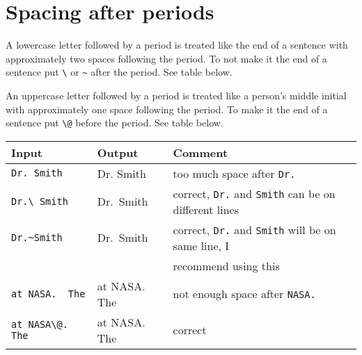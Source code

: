 \UndefineShortVerb{\|}
\DefineShortVerb{\;}  %
\noindent
{
  \setlength{\tabcolsep}{8.5pt}
}
\UndefineShortVerb{\;}
\DefineShortVerb{\|}  %


\section{Spacing after periods}

A lowercase letter followed by a period
is treated like the end of a sentence
with approximately two spaces following the period.
To not make it the end of a sentence put \verb+\+
or \verb+~+ after the period.
See table below.

An uppercase letter followed by a period
is treated like a person's middle initial
with approximately one space following the period.
To make it the end of a sentence put \verb+\@+
before the period.
See table below.

\begin{singlespace}
  \begin{tabular}{@{}lll@{}}
    \toprule
    \bfseries Input& \bfseries Output& \bfseries Comment\\
    \midrule
    \noalign{\vspace{2pt}}
    \verb+Dr. Smith+& Dr. Smith& too much space after \verb+Dr.+\\
    \verb+Dr.\ Smith+& Dr.\ Smith& correct, \verb+Dr.+ and \verb+Smith+ can be on different lines\\
    \verb+Dr.~Smith+& Dr.~Smith& correct, \verb+Dr.+ and \verb+Smith+ will be on same line, I\\
    & & recommend using this\\
    \noalign{\vspace{6pt}}
    \verb+at NASA.  The+& at NASA.  The& not enough space after \verb+NASA.+\\
    \verb+at NASA\@.  The+& at NASA\@.  The& correct\\
    \bottomrule
  \end{tabular}
  \index{\verb*+\ +}
\end{singlespace}

